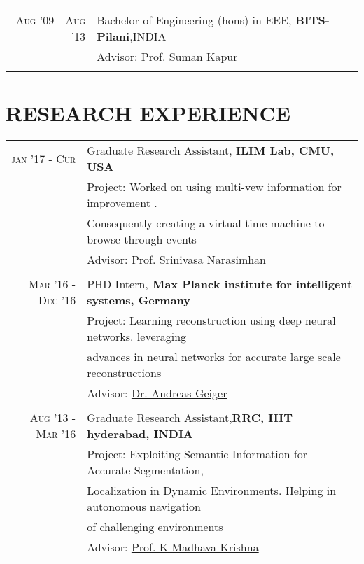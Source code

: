 \documentclass[7pt]{article}
\begin{document}
\begin{small}
\begin{tabular}{rl}
 \vspace{-2 mm}
&\\

\textsc{Aug} '09 - \textsc{Aug} '13 & Bachelor of Engineering (hons) in \textsc{EEE}, \normalsize\textbf{BITS-Pilani},INDIA\\
& 
\normalsize \small Advisor: 
\href{http://www.bits-pilani.ac.in/Hyderabad/sumankapur/Profile} {Prof. Suman Kapur }\\

 \vspace{-2 mm}
&\\

\end{tabular}

\vspace{-4 mm}

\section{RESEARCH EXPERIENCE} 
\begin{tabular}{rl}	
 \textsc{jan '17 - Cur} &  Graduate Research Assistant, \bf{ILIM Lab, CMU, USA}\\
 & Project: Worked on using multi-vew information for improvement . \\ & Consequently creating a virtual time machine to browse through events\\
 & \small Advisor: \href{http://www.cs.cmu.edu/~srinivas/} {Prof. Srinivasa Narasimhan} \\
 
 \vspace{-2 mm}
&\\

 \textsc{Mar '16 - Dec '16} &  PHD Intern,\bf{ Max Planck institute for intelligent systems, Germany}\\
& Project: Learning reconstruction using deep neural networks. leveraging \\   
&  advances in  neural networks for accurate large scale reconstructions\\
&\small Advisor: \href{http://www.cvlibs.net/} {Dr. Andreas Geiger} \\

 \vspace{-2 mm}
&\\

 \textsc{Aug '13 - Mar '16} &  Graduate Research Assistant,\bf{RRC, IIIT hyderabad, INDIA}\\
 & Project: Exploiting Semantic Information for Accurate Segmentation, \\ & Localization in  Dynamic Environments. Helping in autonomous navigation \\
 & of challenging environments \\
 &\normalsize  \small Advisor: \href{https://www.iiit.ac.in/people/faculty/mkrishna/} {Prof. K Madhava Krishna} \\
 

\end{tabular}
\end{small}
\end{document}
